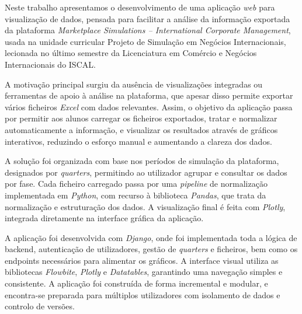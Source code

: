 




Neste trabalho apresentamos o desenvolvimento de uma aplicação \textit{web} para visualização de dados, pensada para facilitar a análise da informação exportada da plataforma \textit{Marketplace Simulations – International Corporate Management}, usada na unidade curricular Projeto de Simulação em Negócios Internacionais, lecionada no último semestre da Licenciatura em Comércio e Negócios Internacionais do ISCAL.

A motivação principal surgiu da ausência de visualizações integradas ou ferramentas de apoio à análise na plataforma, que apesar disso permite exportar vários ficheiros \textit{Excel} com dados relevantes. Assim, o objetivo da aplicação passa por permitir aos alunos carregar os ficheiros exportados, tratar e normalizar automaticamente a informação, e visualizar os resultados através de gráficos interativos, reduzindo o esforço manual e aumentando a clareza dos dados.

A solução foi organizada com base nos períodos de simulação da plataforma, designados por \textit{quarters}, permitindo ao utilizador agrupar e consultar os dados por fase. Cada ficheiro carregado passa por uma \textit{pipeline} de normalização implementada em \textit{Python}, com recurso à biblioteca \textit{Pandas}, que trata da normalização e estruturação dos dados. A visualização final é feita com \textit{Plotly}, integrada diretamente na interface gráfica da aplicação.

A aplicação foi desenvolvida com \textit{Django}, onde foi implementada toda a lógica de backend, autenticação de utilizadores, gestão de \textit{quarters} e ficheiros, bem como os endpoints necessários para alimentar os gráficos. A interface visual utiliza as bibliotecas \textit{Flowbite}, \textit{Plotly} e \textit{Datatables}, garantindo uma navegação simples e consistente. A aplicação foi construída de forma incremental e modular, e encontra-se preparada para múltiplos utilizadores com isolamento de dados e controlo de versões.

